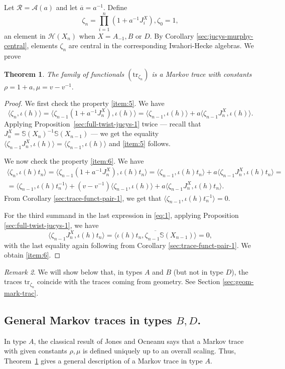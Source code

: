 \documentclass[11pt,leqno]{article}
\newtheorem{theorem}{Theorem}[subsection]
\theoremstyle{definition}
\theoremstyle{definition}
\theoremstyle{remark}
\newtheorem{remark}[theorem]{Remark}%
\newcommand{\He}{\mathcal{H}}
\newcommand{\Se}{\mathbb{S}}
\newcommand{\tr}{\mathrm{tr}}
\begin{document}
Let $\mathcal{R} = \mathcal{A}(a)$ and let $\overline{a} = a^{-1}$. Define
\[
  \zeta_n = \prod_{i = 1}^{n} (1 + a^{-1}J^X_i), \zeta_0 = 1,
\]
an element in $\He(X_n)$ when $X = A_{-1}, B$ or $D$. By Corollary \ref{sec:jucys-murphy-central}, elements $\zeta_n$ are central in the corresponding Iwahori-Hecke algebras.  We prove 
\begin{theorem}
  \label{sec:markov-traces-via}
  The family of functionals $(\tr_{\zeta_n})$ is a Markov trace with constants $\rho = 1 + a, \mu = v-v^{-1}.$
\end{theorem}
\begin{proof}
  We first check the property \ref{item:5}. We have
  \[
    \langle \zeta_n, \iota(h)\rangle = \langle\zeta_{n-1}(1+a^{-1}J^X_n), \iota(h) \rangle = \langle \zeta_{n-1}, \iota(h)\rangle + a\langle\zeta_{n-1}J_n^X, \iota(h)\rangle. 
  \]
  Applying Proposition~\ref{sec:full-twist-jucys-1} twice --- recall that $J_n^X = \Se(X_n)^{-1}\Se(X_{n-1})$ --- we get the equality \(\langle\zeta_{n-1}J_n^X, \iota(h)\rangle = \langle\zeta_{n-1}, \iota(h)\rangle\) and \ref{item:5} follows.

  We now check the property \ref{item:6}. We have
   \begin{multline}
\label{eq:1}
\langle \zeta_n, \iota(h)t_n\rangle = \langle\zeta_{n-1}(1+a^{-1}J^X_n), \iota(h)t_n \rangle = \langle \zeta_{n-1}, \iota(h)t_n\rangle + a\langle\zeta_{n-1}J_n^X, \iota(h)t_n\rangle = \\
= \langle \zeta_{n-1}, \iota(h)t_n^{-1}\rangle +(v-v^{-1}) \langle \zeta_{n-1}, \iota(h)\rangle + a\langle\zeta_{n-1}J_n^X, \iota(h)t_n\rangle. 
\end{multline}
From Corollary \ref{sec:trace-funct-pair-1}, we get that
\(\langle\zeta_{n-1},\iota(h)t_n^{-1}\rangle = 0.\)

  For the third summand in the last expression in \eqref{eq:1}, applying Proposition \ref{sec:full-twist-jucys-1}, we have
  \[
    \langle\zeta_{n-1}J_n^X, \iota(h)t_n\rangle = \overline{\langle \iota(h)t_n,\zeta_{n-1}\Se(X_{n-1})\rangle} = 0,\]
with the last equality again following from Corollary \ref{sec:trace-funct-pair-1}. We obtain \ref{item:6}.
\end{proof}
\begin{remark}
 We will show below that, in types $A$ and $B$ (but not in type $D$), the traces $\tr_{\zeta_n}$ coincide with the traces coming from geometry. See Section \ref{sec:geom-mark-trac}.
\end{remark}
\subsection{General Markov traces in types $B, D$.}
\label{sec:gener-mark-trac-3}
In type $A$, the classical result of Jones and Ocneanu \cite{jonesHeckeAlgebraRepresentations1987} says that a Markov trace with given constants $\rho, \mu$ is defined uniquely up to an overall scaling. Thus, Theorem~\ref{sec:markov-traces-via} gives a general description of a Markov trace in type $A$.
\end{document}
